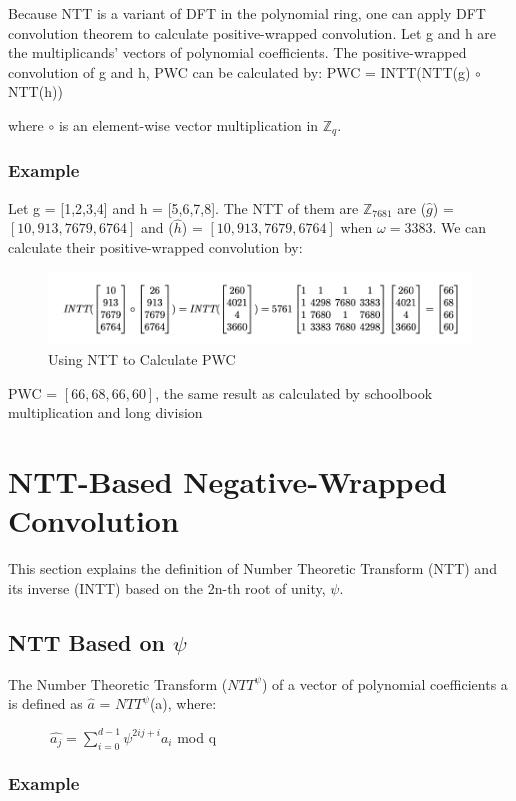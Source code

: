 \documentclass{techrep}
\theoremstyle{definition}
\theoremstyle{plain}
\newcommand{\Z}{\mathbb{Z}}
\begin{document}
	Because NTT is a variant of DFT in the polynomial ring, one can apply DFT convolution theorem to calculate positive-wrapped convolution. Let g and h are the multiplicands’ vectors of polynomial coefficients. The positive-wrapped convolution of g and h, PWC can be calculated by:
	PWC = INTT(NTT(g) $\circ$ NTT(h))

	where $\circ$ is an element-wise vector multiplication in $\Z_{q}$.

	\subsubsection{Example}
	Let g = [1,2,3,4] and h = [5,6,7,8]. The NTT of them are $\Z_{7681}$ are ($\hat{g}$) = $[10, 913, 7679, 6764]$ and ($\hat{h}$) = $[10, 913, 7679, 6764]$ when $\omega =3383$. We can calculate their positive-wrapped convolution by:

	\begin{figure}[H]
		\centering
		\includegraphics[width=.9\columnwidth]{fig/PWC_NTT.png}
		\caption{Using NTT to Calculate PWC}
		\label{fig:PWC_NTT}
	\end{figure}

	PWC = $[66, 68, 66, 60]$, the same result as calculated by schoolbook multiplication and long division



	\section{NTT-Based Negative-Wrapped Convolution}
	This section explains the definition of Number Theoretic Transform (NTT) and its inverse (INTT) based on the 2n-th root of unity, $\psi$.

	\subsection{NTT Based on $\psi$}
	The Number Theoretic Transform (${NTT}^\psi$) of a vector of polynomial coefficients a is defined as $\hat{a}$ = ${NTT}^\psi$(a), where:

	$\quad \quad \quad \hat{a_j} = \sum_{i=0}^{d - 1}\psi^{2ij+i}a_i$ mod q

	\subsubsection{Example}
\end{document}
